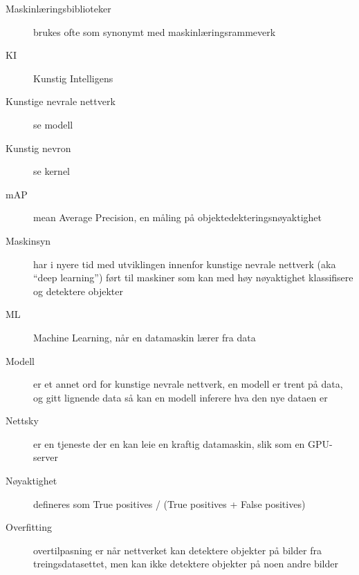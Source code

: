 \begin{description}
\item[Maskinlæringsbiblioteker] brukes ofte som synonymt med maskinlæringsrammeverk
\item[KI] Kunstig Intelligens
\item[Kunstige nevrale nettverk] se modell
\item[Kunstig nevron] se kernel
\item[mAP] mean Average Precision, en måling på objektedekteringsnøyaktighet
\item[Maskinsyn] har i nyere tid med utviklingen innenfor kunstige nevrale nettverk (aka “deep learning”) ført til maskiner som kan med høy nøyaktighet klassifisere og detektere objekter%
\item[ML] Machine Learning, når en datamaskin lærer fra data
\item[Modell] er et annet ord for kunstige nevrale nettverk, en modell er trent på data, og gitt lignende data så kan en modell inferere hva den nye dataen er 
\item[Nettsky] er en tjeneste der en kan leie en kraftig datamaskin, slik som en GPU-server
\item[Nøyaktighet] defineres som True positives / (True positives + False positives)
\item[Overfitting] overtilpasning er når nettverket kan detektere objekter på bilder fra treingsdatasettet, men kan ikke detektere objekter på noen andre bilder

\end{description}
